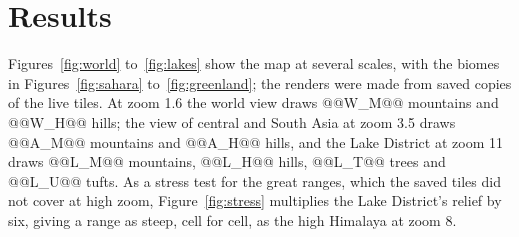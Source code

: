 \documentclass[11pt,a4paper]{article}
\begin{document}
\section{Results}
Figures~\ref{fig:world} to~\ref{fig:lakes} show the map at several scales, with the biomes in Figures~\ref{fig:sahara} to~\ref{fig:greenland}; the renders were made from saved copies of the live tiles. At zoom 1.6 the world view draws @@W_M@@ mountains and @@W_H@@ hills; the view of central and South Asia at zoom 3.5 draws @@A_M@@ mountains and @@A_H@@ hills, and the Lake District at zoom 11 draws @@L_M@@ mountains, @@L_H@@ hills, @@L_T@@ trees and @@L_U@@ tufts. As a stress test for the great ranges, which the saved tiles did not cover at high zoom, Figure~\ref{fig:stress} multiplies the Lake District's relief by six, giving a range as steep, cell for cell, as the high Himalaya at zoom 8.
\end{document}
